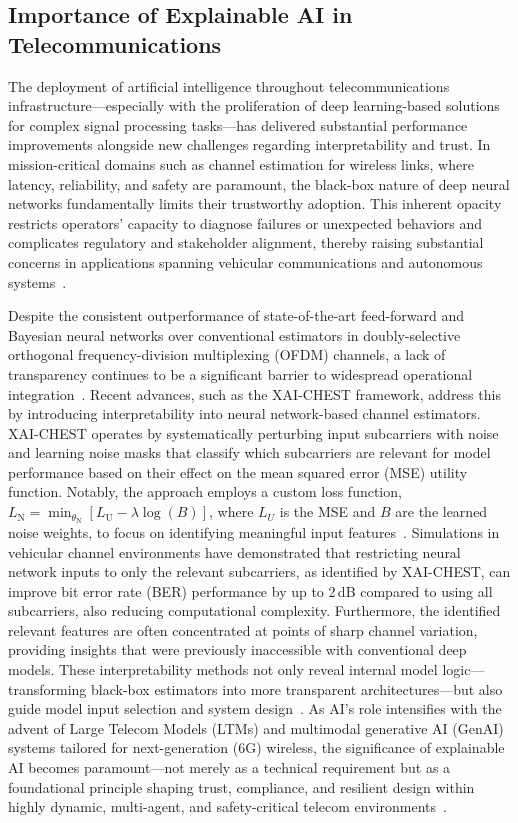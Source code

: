 \documentclass[sigconf]{acmart}
\begin{document}
\subsection{Importance of Explainable AI in Telecommunications}

The deployment of artificial intelligence throughout telecommunications infrastructure—especially with the proliferation of deep learning-based solutions for complex signal processing tasks—has delivered substantial performance improvements alongside new challenges regarding interpretability and trust. In mission-critical domains such as channel estimation for wireless links, where latency, reliability, and safety are paramount, the black-box nature of deep neural networks fundamentally limits their trustworthy adoption. This inherent opacity restricts operators' capacity to diagnose failures or unexpected behaviors and complicates regulatory and stakeholder alignment, thereby raising substantial concerns in applications spanning vehicular communications and autonomous systems~\cite{ref38}\cite{ref41}.

Despite the consistent outperformance of state-of-the-art feed-forward and Bayesian neural networks over conventional estimators in doubly-selective orthogonal frequency-division multiplexing (OFDM) channels, a lack of transparency continues to be a significant barrier to widespread operational integration~\cite{ref38}. Recent advances, such as the XAI-CHEST framework, address this by introducing interpretability into neural network-based channel estimators. XAI-CHEST operates by systematically perturbing input subcarriers with noise and learning noise masks that classify which subcarriers are relevant for model performance based on their effect on the mean squared error (MSE) utility function. Notably, the approach employs a custom loss function, $L_\mathrm{N} = \min_{\theta_\mathrm{N}} [L_\mathrm{U} - \lambda \log(B)]$, where $L_U$ is the MSE and $B$ are the learned noise weights, to focus on identifying meaningful input features~\cite{ref38,ref41}. Simulations in vehicular channel environments have demonstrated that restricting neural network inputs to only the relevant subcarriers, as identified by XAI-CHEST, can improve bit error rate (BER) performance by up to 2\,dB compared to using all subcarriers, also reducing computational complexity. Furthermore, the identified relevant features are often concentrated at points of sharp channel variation, providing insights that were previously inaccessible with conventional deep models. These interpretability methods not only reveal internal model logic—transforming black-box estimators into more transparent architectures—but also guide model input selection and system design~\cite{ref38,ref41}. As AI's role intensifies with the advent of Large Telecom Models (LTMs) and multimodal generative AI (GenAI) systems tailored for next-generation (6G) wireless, the significance of explainable AI becomes paramount—not merely as a technical requirement but as a foundational principle shaping trust, compliance, and resilient design within highly dynamic, multi-agent, and safety-critical telecom environments~\cite{ref41}.
\end{document}
